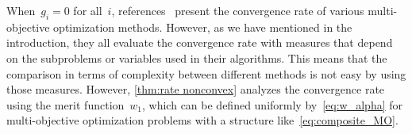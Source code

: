 \documentclass[../../main]{subfiles}
\begin{document}
\begin{remark}
    When~$g_i = 0$ for all~$i$, references~\cite{Calderon2020,Fliege2019,Grapiglia2015} present the convergence rate of various multi-objective optimization methods.
    However, as we have mentioned in the introduction, they all evaluate the convergence rate with measures that depend on the subproblems or variables used in their algorithms.
    This means that the comparison in terms of complexity between different methods is not easy by using those measures.
    However, \cref{thm:rate nonconvex} analyzes the convergence rate using the merit function~$w_1$, which can be defined uniformly by~\cref{eq:w_alpha} for multi-objective optimization problems with a structure like~\cref{eq:composite_MO}.
\end{remark}
\end{document}
